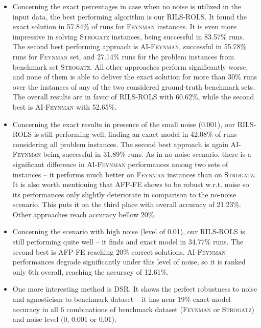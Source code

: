 \documentclass{bmcart}
\begin{document}
\begin{itemize}
	\item Concerning the exact percentages in case when no noise is utilized in the input data, the best performing algorithm is our \textsc{RILS-ROLS}. It found the exact solution in 57.84\% of runs for \textsc{Feynman} instances. It is even more impressive in solving \textsc{Strogatz} instances, being successful in 83.57\% runs. The second best performing  approach is \textsc{AI-Feynman}, successful in 55.78\% runs for \textsc{Feynman} set, and 27.14\% runs for the problem instances from benchmark set \textsc{Strogatz}. All other approaches perform significantly worse, and none of them is able to deliver the exact solution for more than 30\% runs over the instances of any of the two considered ground-truth benchmark sets. The overall results are in favor of \textsc{RILS-ROLS} with 60.62\%, while the second best is \textsc{AI-Feynman} with 52.65\%. 
	\item  Concerning the exact results in presence of the small noise (0.001), our \textsc{RILS-ROLS} is still performing   well, finding an exact model in 42.08\% of runs considering all problem instances. The second best approach is again \textsc{AI-Feynman} being successful in 31.89\% runs. As in no-noise scenario, there is a significant difference in \textsc{AI-Feynman} performances among two sets of instances -- it performs much better on \textsc{Feynman} instances than on \textsc{Strogatz}. It is also worth mentioning that \textsc{AFP-FE} shows to be robust w.r.t. noise so its performances only slightly deteriorate in comparison to the no-noise scenario. This puts it on the third place with overall accuracy of 21.23\%. Other approaches reach accuracy bellow 20\%.  
	\item  Concerning the scenario with high noise (level of 0.01), our \textsc{RILS-ROLS} is still performing quite well -- it finds and exact model in 34.77\% runs. The second best is \textsc{AFP-FE} reaching 20\% correct solutions. \textsc{AI-Feynman} performances degrade significantly under this level of noise, so it is ranked only 6th overall, reaching the accuracy of 12.61\%. 
	
	\item One more interesting method is \textsc{DSR}. It shows the perfect robustness to noise and agnosticism to benchmark dataset -- it has near 19\% exact model accuracy in all 6 combinations of benchmark dataset (\textsc{Feynman} or \textsc{Strogatz}) and noise level (0, 0.001 or 0.01).     
	

\end{itemize}
\end{document}
